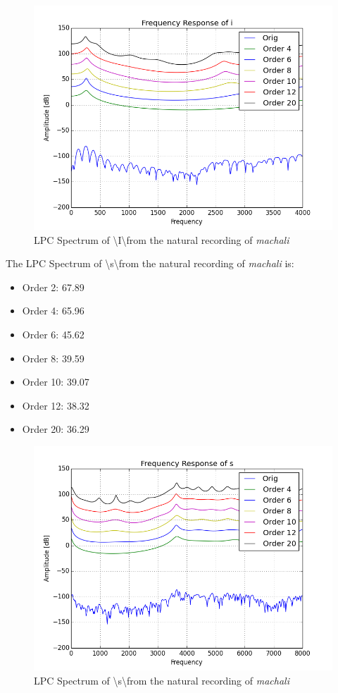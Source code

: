 \documentclass[a4paper]{article}
\begin{document}
\begin{figure}[h!]
    \includegraphics[width=\linewidth]{./images/freq_resp_i.png}
    \caption{LPC Spectrum of \textbackslash I\textbackslash from the natural recording of \textit{machali}}
    \label{fig:1}
\end{figure}

The LPC Spectrum of \textbackslash s\textbackslash from the natural recording of \textit{machali} is: 

\begin{itemize}
\item Order 2: 67.89 
\item Order 4: 65.96
\item Order 6: 45.62
\item Order 8: 39.59
\item Order 10: 39.07
\item Order 12: 38.32
\item Order 20: 36.29
\end{itemize}  


\begin{figure}[h!]
    \includegraphics[width=\linewidth]{./images/freq_resp_s.png}
    \caption{LPC Spectrum of \textbackslash s\textbackslash from the natural recording of \textit{machali}}
    \label{fig:1}
\end{figure}
\end{document}
